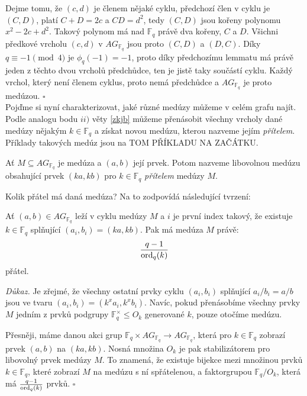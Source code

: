 \documentclass[12pt]{report}
\begin{document}
Dejme tomu, že $(c,d)$ je členem nějaké cyklu, předchozí člen v cyklu je $(C,D)$, platí $C+D=2c$ a $CD = d^2$, tedy $(C,D)$ jsou kořeny polynomu $x^2-2c+d^2$. Takový polynom má nad $\mathbb{F}_q$ právě dva kořeny, $C$ a $D$. Všichni předkové vrcholu $(c,d)$ v $AG_{\mathbb{F}_q}$ jsou proto $(C,D)$ a $(D,C)$. Díky $q \equiv -1 \pmod{4}$ je $\phi_q(-1)=-1$, proto díky předchozímu lemmatu má právě jeden z těchto dvou vrcholů předchůdce, ten je jistě taky součástí cyklu. Každý vrchol, který není členem cyklus, proto nemá předchůdce a $AG_{\mathbb{F}_q}$ je proto medúzou. \hfill $\square$\\


Pojďme si nyní charakterizovat, jaké různé medúzy můžeme v celém grafu najít. Podle analogu bodu $ii)$ věty \ref{zkjb} můžeme přenásobit všechny vrcholy dané medúzy nějakým $k \in \mathbb{F}_q$ a získat novou medúzu, kterou nazveme jejím \textit{přítelem}. Příklady takových medúz jsou na TOM PŘÍKLADU NA ZAČÁTKU.
\begin{definice}
Ať $M \subseteq AG_{\mathbb{F}_q}$ je medúza a $(a,b)$ její prvek. Potom nazveme libovolnou medúzu obsahující prvek $(ka,kb)$ pro $k \in \mathbb{F}_q$ \textit{přítelem} medúzy $M$.
\end{definice}

 Kolik přátel má daná medúza? Na to zodpovídá následující tvrzení:
\begin{veta}\label{isom}
Ať $(a,b) \in AG_{\mathbb{F}_q}$ leží v cyklu medúzy $M$ a $i$ je první index takový, že existuje $k \in \mathbb{F}_q$ splňující $(a_i,b_i) = (ka, kb)$. Pak má medúza $M$ právě:
$$\frac{q-1}{\operatorname{ord}_q (k)}$$
přátel.
\end{veta}

\noindent \textit{Důkaz.} Je zřejmé, že všechny ostatní prvky cyklu $(a_i,b_i)$ splňující $a_i/b_i = a/b$ jsou ve tvaru $(a_i,b_i) = (k^x a_i, k^x b_i)$. Navíc, pokud přenásobíme všechny prvky $M$ jedním z prvků podgrupy $\mathbb{F}_q ^{\times} \leqslant O_k$ generované $k$, pouze otočíme medúzu.

Přesněji, máme danou akci grup $\mathbb{F}_q \times AG_{\mathbb{F}_q} \longrightarrow AG_{\mathbb{F}_q}$, která pro $k \in \mathbb{F}_q$ zobrazí prvek $(a,b)$ na $(ka,kb)$. Nosná množina $O_k$ je pak stabilizátorem pro libovolný prvek medúzy $M$. To znamená, že existuje bijekce mezi množinou prvků $k \in \mathbb{F}_q$, které zobrazí $M$ na medúzu s ní spřátelenou, a faktorgrupou $\mathbb{F}_q/O_k$, která má $\frac{q-1}{\operatorname{ord}_q (k)}$ prvků. \hfill $\square$\\
\end{document}
